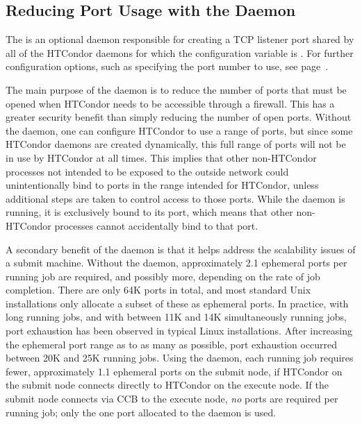 \subsection{\label{sec:shared-port-daemon}Reducing Port Usage with the  Daemon}

The  is an optional daemon
responsible for creating a TCP listener port shared by all of the
HTCondor daemons for which the configuration variable
 is .
For further configuration
options, such as specifying the port number to use, see page~\pageref{sec:Config-shared-port}.

The main purpose of the  daemon is to reduce the
number of ports that must be opened when HTCondor needs to be
accessible through a firewall.
This has a greater security benefit
than simply reducing the number of open ports.
Without the  daemon,
one can configure HTCondor to use a range of ports,
but since some HTCondor daemons are created dynamically, 
this full range of ports will not be in use by HTCondor at all times.
This implies that other non-HTCondor processes not intended to be exposed to
the outside network could unintentionally bind to ports in the range
intended for HTCondor,
unless additional steps are taken to control access to those ports.  
While the  daemon is running,
it is exclusively bound to its port, which means that other non-HTCondor
processes cannot accidentally bind to that port.

A secondary benefit of the  daemon
is that it helps address the scalability issues of a submit machine.
Without the  daemon,
approximately 2.1 ephemeral ports per running job are required,
and possibly more, depending on the rate of job completion.
There are only 64K ports in total,
and most standard Unix installations only allocate a subset of
these as ephemeral ports.
In practice, with long running jobs,
and with between 11K and 14K simultaneously running jobs,
port exhaustion has been observed in typical Linux installations.
After increasing the ephemeral port range as to as many as possible,
port exhaustion occurred between 20K and 25K running jobs.
Using the  daemon,
each running job requires fewer, approximately 1.1 ephemeral ports
on the submit node, if HTCondor on the submit node connects directly
to HTCondor on the execute node.
If the submit node connects via CCB to the execute
node, \emph{no} ports are required per running job; only the one port
allocated to the  daemon is used.

